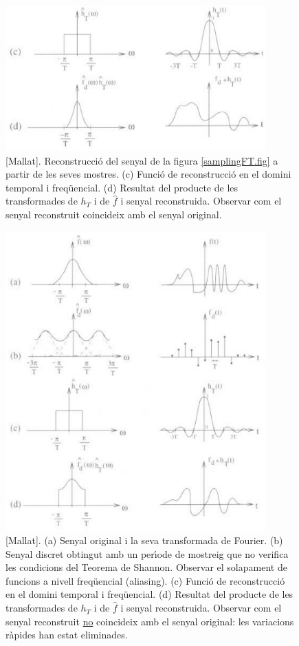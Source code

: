 \documentclass{article}
\begin{document}
\begin{figure}[htbp]
\begin{center}
\includegraphics[width=10cm]{imatges/reconstruction.eps}
\caption{
[Mallat].
Reconstrucci\'o del senyal de la figura \ref{samplingFT.fig} a partir de les
seves mostres. (c) Funci\'o de reconstrucci\'o en el domini temporal
i freq\"uencial. (d) Resultat del producte de les transformades de $h_T$
i de $\hat{f}$ i senyal reconstruida. Observar com el senyal reconstruit
coincideix amb el senyal original.}
\label{mostreigOk.fig}
\end{center}
\end{figure}   

\begin{figure}[htbp]
\begin{center}
\includegraphics[width=10cm]{imatges/aliasing.eps}
\caption{
[Mallat].
(a) Senyal original i la seva transformada de Fourier.
(b) Senyal discret obtingut amb un per\'\i ode de mostreig que
no verifica les condicions del Teorema de Shannon. Observar el solapament
de funcions a nivell freq\"uencial (aliasing).
(c) Funci\'o de reconstrucci\'o en el domini temporal
i freq\"uencial. (d) Resultat del producte de les transformades de $h_T$
i de $\hat{f}$ i senyal reconstruida. Observar com el senyal reconstruit
\underline{no} coincideix amb el senyal original: les variacions
r\`apides han estat eliminades.}
\label{aliasing.fig}
\end{center}
\end{figure}  
 
\end{document}
